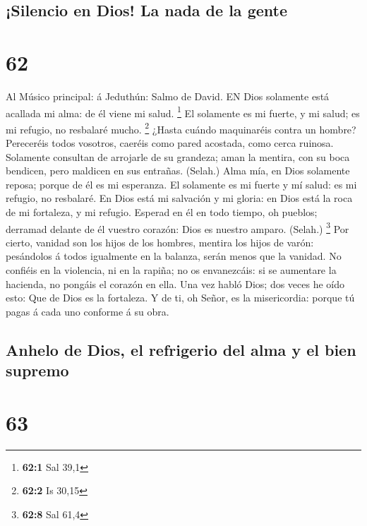 \hypertarget{silencio-en-dios-la-nada-de-la-gente}{%
\subsection{¡Silencio en Dios! La nada de la
gente}\label{silencio-en-dios-la-nada-de-la-gente}}

\hypertarget{section-61}{%
\section{62}\label{section-61}}

 Al Músico principal: á Jeduthún: Salmo de David. EN Dios
solamente está acallada mi alma: de él viene mi salud. \footnote{\textbf{62:1}
  Sal 39,1}  El solamente es mi fuerte, y mi salud; es mi
refugio, no resbalaré mucho. \footnote{\textbf{62:2} Is 30,15}
 ¿Hasta cuándo maquinaréis contra un hombre? Pereceréis
todos vosotros, caeréis como pared acostada, como cerca ruinosa.
 Solamente consultan de arrojarle de su grandeza; aman la
mentira, con su boca bendicen, pero maldicen en sus entrañas. (Selah.)
 Alma mía, en Dios solamente reposa; porque de él es mi
esperanza.  El solamente es mi fuerte y mí salud: es mi
refugio, no resbalaré.  En Dios está mi salvación y mi
gloria: en Dios está la roca de mi fortaleza, y mi refugio. 
Esperad en él en todo tiempo, oh pueblos; derramad delante de él vuestro
corazón: Dios es nuestro amparo. (Selah.) \footnote{\textbf{62:8} Sal
  61,4}  Por cierto, vanidad son los hijos de los hombres,
mentira los hijos de varón: pesándolos á todos igualmente en la balanza,
serán menos que la vanidad.  No confiéis en la violencia,
ni en la rapiña; no os envanezcáis: si se aumentare la hacienda, no
pongáis el corazón en ella.  Una vez habló Dios; dos veces
he oído esto: Que de Dios es la fortaleza.  Y de ti, oh
Señor, es la misericordia: porque tú pagas á cada uno conforme á su
obra.

\hypertarget{anhelo-de-dios-el-refrigerio-del-alma-y-el-bien-supremo}{%
\subsection{Anhelo de Dios, el refrigerio del alma y el bien
supremo}\label{anhelo-de-dios-el-refrigerio-del-alma-y-el-bien-supremo}}

\hypertarget{section-62}{%
\section{63}\label{section-62}}

